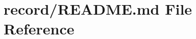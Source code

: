 \hypertarget{record_2README_8md}{\section{record/\-R\-E\-A\-D\-M\-E.md File Reference}
\label{record_2README_8md}
}
